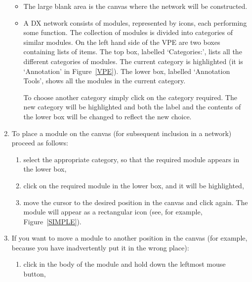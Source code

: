 \documentclass[twoside,11pt]{article}
\begin{document}
\begin{enumerate}
  \begin{itemize}

    \item The large blank area is the canvas where the network will be
     constructed.

    \item A DX network consists of modules, represented by icons, each
     performing some function. The collection of modules is divided
     into categories of similar modules. On the left hand side of the
     VPE are two boxes containing lists of items. The top box, labelled
     `Categories:', lists all the different categories of modules. The
     current category is highlighted (it is `Annotation' in
     Figure~\ref{VPE}). The lower box, labelled `Annotation Tools',
     shows all the modules in the current category.

     To choose another category simply click on the category required.
     The new category will be highlighted and both the label and the
     contents of the lower box will be changed to reflect the new
     choice.

  \end{itemize}

  \item To place a module on the canvas (for subsequent inclusion in a
   network) proceed as follows:

  \begin{enumerate}

    \item select the appropriate category, so that the required module
     appears in the lower box,

    \item click on the required module in the lower box, and it will be
     highlighted,

    \item move the cursor to the desired position in the canvas and
     click again. The module will appear as a rectangular icon (see,
     for example, Figure~\ref{SIMPLE}).

  \end{enumerate}

  \item If you want to move a module to another position in the canvas
   (for example, because you have inadvertently put it in the wrong
   place):

  \begin{enumerate}

    \item click in the body of the module and hold down the leftmost
     mouse button,


\end{enumerate}
\end{enumerate}
\end{document}
